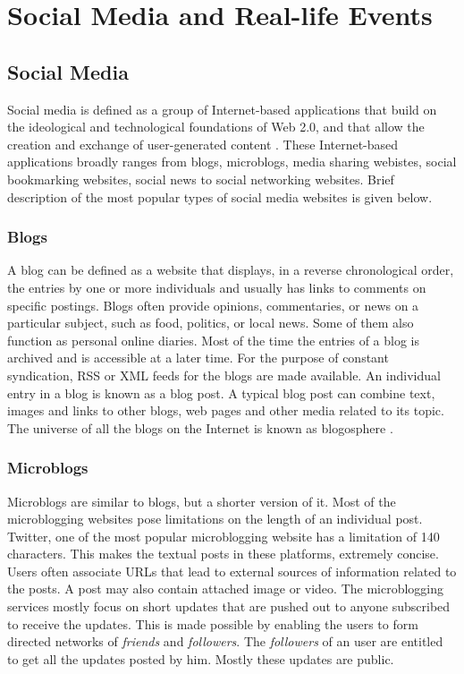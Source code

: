 
\chapter{Social Media and Real-life Events} %

\label{events} %


\section{Social Media}
Social media is defined as a group of Internet-based applications that build on the ideological and technological foundations of Web 2.0, and that allow the creation and exchange of user-generated content \cite{kaplan2010users}. These Internet-based applications broadly ranges from blogs, microblogs, media sharing webistes, social bookmarking websites, social news to social networking websites. Brief description of the most popular types of social media websites is given below.

\subsection{Blogs}
A blog can be defined as a website that displays, in a reverse chronological order, the entries by one or more individuals and usually has links to comments on specific postings. Blogs often provide opinions, commentaries, or news on a particular subject, such as food, politics, or local news. Some of them also function as personal online diaries. Most of the time the entries of a blog is archived and is accessible at a later time. For the purpose of constant syndication, RSS or XML feeds for the blogs are made available. An individual entry in a blog is known as a blog post. A typical blog post can combine text, images and links to other blogs, web pages and other media related to its topic. The universe of all the blogs on the Internet is known as blogosphere \cite{agarwal2014time}.

\subsection{Microblogs}
Microblogs are similar to blogs, but a shorter version of it. Most of the microblogging websites pose limitations on the length of an individual post. Twitter, one of the most popular microblogging website has a limitation of 140 characters. This makes the textual posts in these platforms, extremely concise. Users often associate URLs that lead to external sources of information related to the posts. A post may also contain attached image or video. The microblogging services mostly focus on short updates that are pushed out to anyone subscribed to receive the updates. This is made possible by enabling the users to form directed networks of \textit{friends} and \textit{followers}. The \textit{followers} of an user are entitled to get all the updates posted by him. Mostly these updates are public. 

